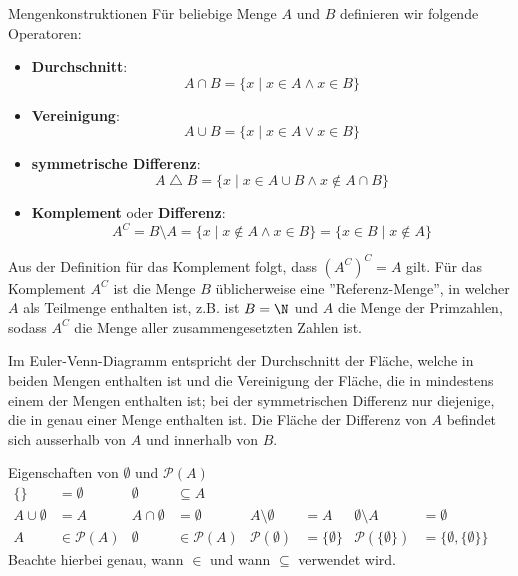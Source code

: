 \begin{definition}{Mengenkonstruktionen}{}
Für beliebige Menge $A$ und $B$ definieren wir folgende Operatoren:
\begin{itemize}
    \item \textbf{Durchschnitt}: 
        $$ A \cap B = \{x \mid x \in A \land x \in B\}$$
    \item \textbf{Vereinigung}:
        $$ A \cup B = \{x \mid x \in A \lor x \in B\}$$
    \item \textbf{symmetrische Differenz}:
        $$ A \bigtriangleup B = \{x \mid x \in A \cup B \land x \notin A \cap B\}$$
    \item \textbf{Komplement} oder \textbf{Differenz}:
        $$ A^C = B \setminus A = \{x \mid x \notin A \land x \in B\} = \{x \in B \mid x \notin A\}$$
\end{itemize}
\end{definition}
Aus der Definition für das Komplement folgt, dass $(A^C)^C = A$ gilt. Für das Komplement $A^C$ ist die Menge $B$ üblicherweise eine ''Referenz-Menge'', in welcher $A$ als Teilmenge enthalten ist, z.B. ist $B = \N$ und $A$ die Menge der Primzahlen, sodass $A^C$ die Menge aller zusammengesetzten Zahlen ist.

Im Euler-Venn-Diagramm entspricht der Durchschnitt der Fläche, welche in beiden Mengen enthalten ist und die Vereinigung der Fläche, die in mindestens einem der Mengen enthalten ist; bei der symmetrischen Differenz nur diejenige, die in genau einer Menge enthalten ist. Die Fläche der Differenz von $A$ befindet sich ausserhalb von $A$ und innerhalb von $B$. 

\begin{lemma}{Eigenschaften von $\emptyset$ und $\mathcal{P}(A)$}{}
\begin{align*}
        \{\} &= \emptyset  &  \emptyset &\subseteq A & & & & & &\\
        A \cup \emptyset &= A & A \cap \emptyset &= \emptyset &  A \setminus \emptyset &= A & \emptyset \setminus A &= \emptyset\\
        A &\in \mathcal{P}(A) & \emptyset &\in \mathcal{P}(A)& \mathcal{P}(\emptyset)&= \{\emptyset\}  & \mathcal{P}(\{\emptyset\})&=\{\emptyset, \{\emptyset\}\}
\end{align*}
Beachte hierbei genau, wann $\in$ und wann $\subseteq$ verwendet wird. 
\end{lemma}

